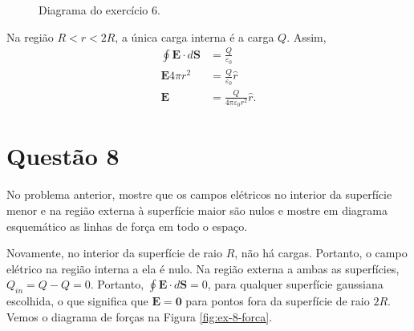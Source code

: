 \documentclass[11pt]{article}
\begin{document}
\begin{figure}[h!]
  \centering
  \caption{Diagrama do exercício 6.}
  \label{fig:ex-6}
\end{figure}
Na região \(R<r<2R\), a única carga interna é a carga \(Q\). Assim,
\begin{align*}
  \oint \mathbf E\cdot d\mathbf S &= \frac{Q}{\varepsilon_0}\\
  \mathbf E 4\pi r^2 &= \frac{Q}{\varepsilon_0}\hat r\\
  \mathbf E  &= \frac{Q}{4\pi \varepsilon_0r^2}\hat r.
\end{align*}

\section{Questão 8}
\label{sec:org7566dde}
No problema anterior, mostre que os campos elétricos no interior da
superfície menor e na região externa à superfície maior são nulos e
mostre em diagrama esquemático as linhas de força em todo o espaço.

Novamente, no interior da superfície de raio \(R\), não há
cargas. Portanto, o campo elétrico na região interna a ela é nulo. Na
região externa a ambas as superfícies, \(Q_{in}=Q-Q=0\). Portanto, \(\oint\mathbf
E\cdot d\mathbf S = 0\), para qualquer superfície gaussiana escolhida, o que
significa que \(\mathbf E = \mathbf0\) para pontos fora da superfície de
raio \(2R\). Vemos o diagrama de forças na Figura \ref{fig:ex-8-forca}.
\end{document}

